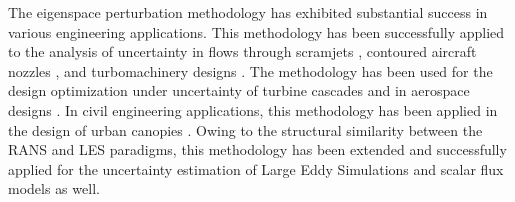 The eigenspace perturbation methodology has exhibited substantial success in various engineering applications.
This methodology has been successfully applied to the analysis of uncertainty in flows through scramjets \cite{emory2011characterizing}, contoured aircraft nozzles \cite{mishra2019uncertainty,aiaajets, envelopingmodels, alonso2017scalable}, and turbomachinery designs \cite{emory2016uncertainty}.
The methodology has been used for the design optimization under uncertainty of turbine cascades \cite{razaaly2019optimization} and in aerospace designs \cite{cook2019optimization}.
In civil engineering applications, this methodology has been applied in the design of urban canopies \cite{garcia2014quantifying,ricci2015local}.
Owing to the structural similarity between the RANS and LES paradigms, this methodology has been extended and successfully applied for the uncertainty estimation of Large Eddy Simulations and scalar flux models \cite{gorle2013framework} as well.


